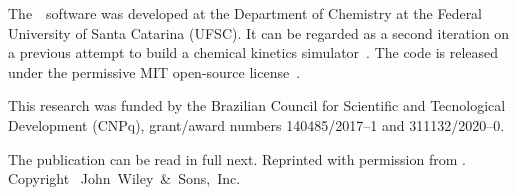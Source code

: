 The~\overreact{}~software was developed at the Department of Chemistry at the Federal University of Santa Catarina (UFSC).
It can be regarded as a second iteration on a previous attempt to build a chemical kinetics simulator~\cite{pyrrole2019zenodo}.
The code is released under the permissive MIT open-source license~\cite{MITLicense}.

This research was funded by the Brazilian Council for Scientific and Tecnological Development (CNPq),
grant/award numbers 140485/2017--1 and 311132/2020--0.

The publication can be read in full next.
Reprinted with permission from
.
Copyright~\citeyear{Schneider_2022}
John~Wiley~\&~Sons,~Inc.


